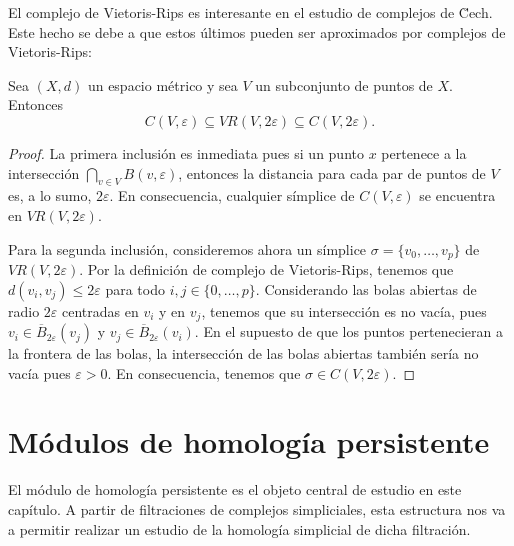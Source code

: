 El complejo de Vietoris-Rips es interesante en el estudio de complejos de \u Cech. Este hecho se debe a que estos últimos pueden ser aproximados por complejos de Vietoris-Rips:

\begin{proposicion}
	Sea \((X,d)\) un espacio métrico y sea \(V\) un subconjunto de puntos de \(X\). Entonces
	\[
		C(V, \varepsilon) \subseteq VR(V, 2\varepsilon) \subseteq C(V, 2\varepsilon).
	\]
\end{proposicion}
\begin{proof}
	La primera inclusión es inmediata pues si un punto \(x\) pertenece a la intersección \(\bigcap_{v \in V} B(v, \varepsilon)\), entonces la distancia para cada par de puntos de \(V\) es, a lo sumo, \(2 \varepsilon\). En consecuencia, cualquier símplice de \(C(V,\varepsilon)\) se encuentra en \(VR(V, 2\varepsilon)\).
	
	Para la segunda inclusión, consideremos ahora un símplice \(\sigma = \{v_0, \dots, v_p\}\) de \(VR(V, 2\varepsilon)\). Por la definición de complejo de Vietoris-Rips, tenemos que \(d(v_i, v_j) \leq 2\varepsilon\) para todo \(i,j \in \{0, \dots, p\}\). Considerando las bolas abiertas de radio \(2\varepsilon\) centradas en \(v_i\) y en \(v_j\), tenemos que su intersección es no vacía, pues \(v_i \in \overline{B}_{2\varepsilon}(v_j)\) y \(v_j \in \overline{B}_{2\varepsilon}(v_i)\). En el supuesto de que los puntos pertenecieran a la frontera de las bolas, la intersección de las bolas abiertas también sería no vacía pues \(\varepsilon > 0\). En consecuencia, tenemos que \(\sigma \in C(V,2\varepsilon)\).
\end{proof}

\section{Módulos de homología persistente}

El módulo de homología persistente es el objeto central de estudio en este capítulo. A partir de filtraciones de complejos simpliciales, esta estructura nos va a permitir realizar un estudio de la homología simplicial de dicha filtración.

